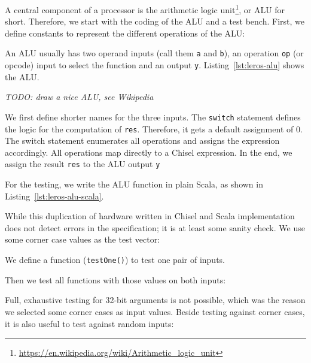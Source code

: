 \documentclass[%
    10pt,
    headinclude, footexclude,
    openright, %
    notitlepage,
    cleardoubleempty,
    headsepline,
    pointlessnumbers,
    bibtotoc, idxtotoc,
    ]{scrbook}
\newcommand{\code}[1]{{\lstinline[basicstyle=\small\ttfamily]{#1}}}
\newcommand{\todo}[1]{{\emph{TODO: #1}}}
\newcommand{\myref}[2]{\href{#1}{#2}}
\renewcommand{\myref}[2]{{#2}{\footnote{\url{#1}}}}
\begin{document}

A central component of a processor is the
\myref{https://en.wikipedia.org/wiki/Arithmetic_logic_unit}{arithmetic logic unit}, or ALU for short.
Therefore, we start with the coding of the ALU and a test bench.
First, we define constants to represent the different operations of the ALU:


\noindent An ALU usually has two operand inputs (call them \code{a} and \code{b}), an operation \code{op}
(or opcode) input to select the function and an output \code{y}.
Listing~\ref{lst:leros-alu} shows the ALU.

\todo{draw a nice ALU, see Wikipedia}



We first define shorter names for the three inputs. The \code{switch} statement defines the
logic for the computation of \code{res}. Therefore, it gets a default assignment of 0.
The switch statement enumerates all operations and assigns the expression accordingly.
All operations map directly to a Chisel expression.
In the end, we assign the result \code{res} to the ALU output \code{y}


For the testing, we write the ALU function in plain Scala, as shown in Listing~\ref{lst:leros-alu-scala}.


\noindent While this duplication of hardware written in Chisel and Scala implementation does not
detect errors in the specification; it is at least some sanity check.
We use some corner case values as the test vector:

\newpage
{}

\noindent We define a function (\code{testOne()}) to test one pair of inputs.

\noindent Then we test all functions with those values on both inputs:


\noindent Full, exhaustive testing for 32-bit arguments is not possible, which was the reason we
selected some corner cases as input values. Beside testing against corner cases, it is also useful
to test against random inputs:
\end{document}
